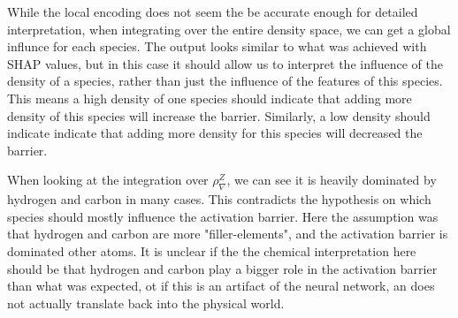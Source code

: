 While the local encoding does not seem the be accurate enough for detailed interpretation,
when integrating over the entire density space, we can get a global influnce for each species.
The output looks similar to what was achieved with SHAP values, but in this case it should allow us to interpret
the influence of the density of a species, rather than just the influence of the features of this species.
This means a high density of one species should indicate that adding more density of this species will increase the barrier.
Similarly, a low density should indicate indicate that adding more density for this species will decreased the barrier.

When looking at the integration over $\rho^Z_\nabla$, we can see it is heavily dominated by hydrogen and carbon
in many cases.
This contradicts the hypothesis on which species should mostly influence the activation barrier.
Here the assumption was that hydrogen and carbon are more "filler-elements", and the activation 
barrier is dominated other atoms.
It is unclear if the the chemical interpretation here should be that hydrogen and carbon play a bigger role in the activation
barrier than what was expected, ot if this is an artifact of the neural network, an does not actually translate back into 
the physical world.